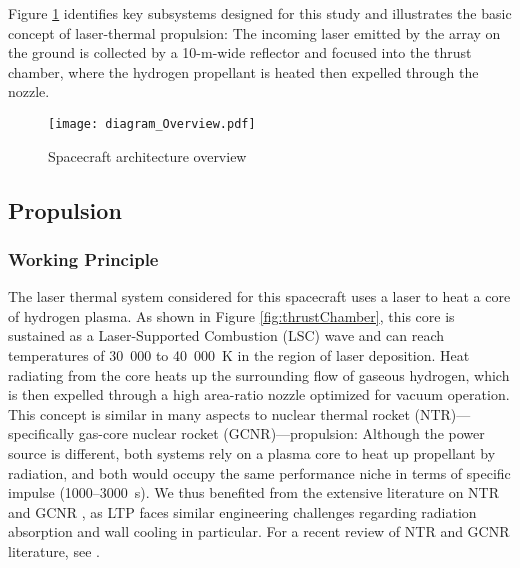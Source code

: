 \documentclass[final,3p,times,twocolumn,sort&compress, lefttitle]{elsarticle}
\begin{document}
        Figure \ref{fig:overview} identifies key subsystems designed for this study and illustrates the basic concept of laser-thermal propulsion: The incoming laser emitted by the array on the ground is collected by a 10-m-wide reflector and focused into the thrust chamber, where the hydrogen propellant is heated then expelled through the nozzle.
                        
        \begin{figure}[t]
            \centering
            \texttt{[image: diagram\_Overview.pdf]}
            \caption{Spacecraft architecture overview}
            \label{fig:overview}
        \end{figure}
        
        \subsection{Propulsion}
            \subsubsection{Working Principle}
                The laser thermal system considered for this spacecraft uses a laser to heat a core of hydrogen plasma. As shown in Figure \ref{fig:thrustChamber}, this core is sustained as a Laser-Supported Combustion (LSC) wave and can reach temperatures of 30~000 to 40~000~K in the region of laser deposition. Heat radiating from the core heats up the surrounding flow of gaseous hydrogen, which is then expelled through a high area-ratio nozzle optimized for vacuum operation. This concept is similar in many aspects to nuclear thermal rocket (NTR)---specifically gas-core nuclear rocket (GCNR)---propulsion: Although the power source is different, both systems rely on a plasma core to heat up propellant by radiation, and both would occupy the same performance niche in terms of specific impulse (1000--3000~s). We thus benefited from the extensive literature on NTR and GCNR \cite{rom_nuclear-rocket_1968, poston_heat_1992, kascak_nozzle_1971, kramer_transpiration-cooled_1965}, as LTP faces similar engineering challenges regarding radiation absorption and wall cooling in particular. For a recent review of NTR and GCNR literature, see \cite{warn_roadmap_2021}.
                
\end{document}
